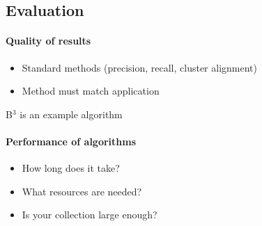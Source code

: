 \documentclass[10pt,a4paper]{scrreprt}
\begin{document}
\subsection{Evaluation}
\paragraph{Quality of results}
\begin{itemize}
	\item Standard methods (precision, recall, cluster alignment)
	\item Method must match application
\end{itemize}
B$^3$ is an example algorithm
\paragraph{Performance of algorithms}
\begin{itemize}
	\item How long does it take?
	\item What resources are needed?
	\item Is your collection large enough?
\end{itemize}
\end{document}
